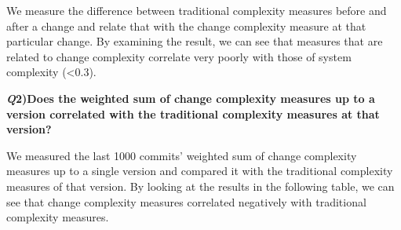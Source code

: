 \documentclass[9pt,twocolumn,a4paper]{article}
\begin{document}
We measure the difference between traditional complexity measures before and after a change and relate that with the change complexity measure at that particular change. By examining the result, we can see that measures that are related to change complexity correlate very poorly with those of system complexity (\textless 0.3).
\newline

\begin{table}[ht]

\centering
{}
\caption {\small Correlation Matrix of Research Question 1.}
\label{tab:table1} 

\end{table}

{\bf{\emph Q2)Does the weighted sum of change complexity measures up to a version correlated with the traditional complexity measures at that version? }}
\newline

We measured the last 1000 commits' weighted sum of change complexity measures up to a single version and compared it with the traditional complexity measures of that version. By looking at the results in the following table, we can see that change complexity measures correlated negatively with traditional complexity measures.
\newline
\end{document}
